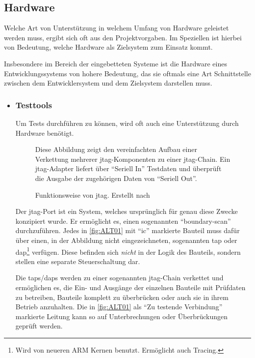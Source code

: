 \subsection{Hardware}\label{sub:hardware}
Welche Art von Unterstützung in welchem Umfang von Hardware geleistet werden
muss, ergibt sich oft aus den Projektvorgaben. Im Speziellen ist hierbei von
Bedeutung, welche Hardware als Zielsystem zum Einsatz kommt.

Insbesondere im Bereich der eingebetteten Systeme ist die Hardware eines
Entwicklungssystems von hohere Bedeutung, das sie oftmals eine Art Schnittstelle
zwischen dem Entwicklersystem und dem Zielsystem darstellen muss.
\begin{itemize}
  \item \subsubsection*{Testtools} Um Tests durchführen zu können, wird
  oft auch eine Unterstützung durch Hardware benötigt. 
  \begin{figure}[!ht]
    \centering
    \def\svgwidth{\columnwidth}
    
    \caption{Funktionsweise von \gls{jtag}. Erstellt nach \cite{ALT01}}{Diese
    Abbildung zeigt den vereinfachten Aufbau einer Verkettung
    mehrerer \gls{jtag}-Komponenten zu einer \gls{jtag}-Chain. Ein
    \gls{jtag}-Adapter liefert über "`Seriell In"' Testdaten und überprüft die
    Ausgabe der zugehörigen Daten von "`Seriell Out"'. }
    \label{fig:ALT01}
  \end{figure}
  Der \gls{jtag}-Port ist ein System, welches ursprünglich für genau diese
  Zwecke konzipiert wurde. Er ermöglicht es, einen sogenannten "`boundary-scan"'
  durchzuführen. Jedes in \autoref{fig:ALT01} mit "`\gls{ic}"' markierte
  Bauteil muss dafür über einen, in der Abbildung nicht eingezeichneten, sogenannten \gls{tap} oder
  \gls{dap}\footnote{Wird von neueren ARM Kernen benutzt.
  Ermöglicht auch Tracing.} verfügen. Diese befinden sich \emph{nicht} in der
  Logik des Bauteils, sondern stellen eine separate Steuerschaltung dar.
  
  Die \glspl{tap}/\glspl{dap} werden zu einer sogenannten
  \gls{jtag}-Chain verkettet und ermöglichen es, die Ein- und Ausgänge der
  einzelnen Bauteile mit Prüfdaten zu betreiben, Bauteile komplett zu überbrücken oder auch sie in ihrem Betrieb anzuhalten.
  Die in \autoref{fig:ALT01} als "`Zu testende Verbindung"' markierte Leitung
  kann so auf Unterbrechungen oder Überbrückungen geprüft werden.
  

\end{itemize}
